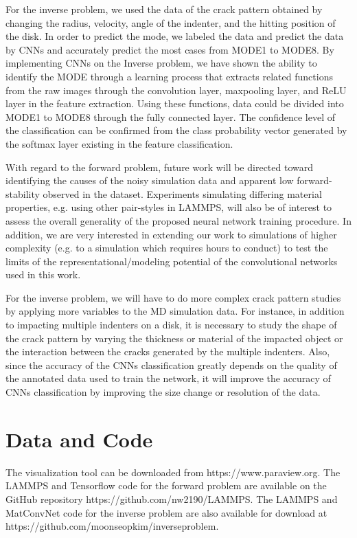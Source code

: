 For the inverse problem, we used the data of the crack pattern obtained by changing the radius, velocity, angle of the indenter, and the hitting position of the disk. In order to predict the mode, we labeled the data and predict the data by CNNs and accurately predict the most cases from MODE1 to MODE8. By implementing CNNs on the Inverse problem, we have shown the ability to identify the MODE through a learning process that extracts related functions from the raw images through the convolution layer, maxpooling layer, and ReLU layer in the feature extraction. Using these functions, data could be divided into MODE1 to MODE8 through the fully connected layer. The confidence level of the classification can be confirmed from the class probability vector generated by the softmax layer existing in the feature classification. 

With regard to the forward problem, future work will be directed toward identifying the causes of the noisy simulation data and apparent low forward-stability observed in the dataset.  Experiments simulating differing material properties, e.g. using other pair-styles in LAMMPS, will also be of interest to assess the overall generality of the proposed neural network training procedure.  In addition, we are very interested in extending our work to simulations of higher complexity (e.g. to a simulation which requires hours to conduct) to test the limits of the representational/modeling potential of the convolutional networks used in this work.

For the inverse problem, we will have to do more complex crack pattern studies by applying more variables to the MD simulation data. For instance, in addition to impacting multiple indenters on a disk, it is necessary to study the shape of the crack pattern by varying the thickness or material of the impacted object or the interaction between the cracks generated by the multiple indenters. Also, since the accuracy of the CNNs classification greatly depends on the quality of the annotated data used to train the network, it will improve the accuracy of CNNs classification by improving the size change or resolution of the data. 


\section{Data and Code}
\label{sec:6}
The visualization tool can be downloaded from https://www.paraview.org.
The LAMMPS and Tensorflow code for the forward problem are available on the GitHub repository  https://github.com/nw2190/LAMMPS.
The LAMMPS and MatConvNet code for the inverse problem are also available for download at  https://github.com/moonseopkim/inverseproblem.


